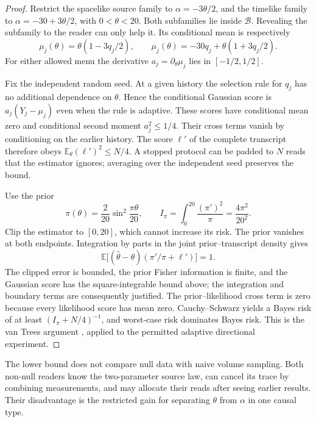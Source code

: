 \documentclass[12pt,a4paper]{article}
\theoremstyle{definition}
\newcommand{\E}{\mathbb E}
\begin{document}
\begin{proof}
Restrict the spacelike source family to $\alpha=-3\theta/2$, and the
timelike family to $\alpha=-30+3\theta/2$, with $0<\theta<20$. Both
subfamilies lie inside $\mathcal B$. Revealing the subfamily to the reader
can only help it. Its conditional mean is respectively
\begin{equation}
 \mu_j(\theta)=\theta(1-3q_j/2),\qquad
 \mu_j(\theta)=-30q_j+\theta(1+3q_j/2).
\end{equation}
For either allowed menu the derivative $a_j=\partial_\theta\mu_j$ lies
in $[-1/2,1/2]$.

Fix the independent random seed. At a given history the selection rule
for $q_j$ has no additional dependence on $\theta$. Hence the conditional
Gaussian score is $a_j(Y_j-\mu_j)$ even when the rule is adaptive. These
scores have conditional mean zero and conditional second moment
$a_j^2\leq1/4$. Their cross terms vanish by conditioning on the earlier
history. The score $\ell'$ of the complete transcript therefore obeys
$\E_\theta(\ell')^2\leq N/4$. A stopped protocol can be padded to $N$
reads that the estimator ignores; averaging over the independent seed
preserves the bound.

Use the prior
\begin{equation}
 \pi(\theta)=\frac2{20}\sin^2\frac{\pi\theta}{20},
 \qquad I_\pi=\int_0^{20}\frac{(\pi')^2}{\pi}
              =\frac{4\pi^2}{20^2}.
 \label{eq:prior}
\end{equation}
Clip the estimator to $[0,20]$, which cannot increase its risk. The prior
vanishes at both endpoints. Integration by parts in the joint
prior--transcript density gives
\begin{equation}
 \E\bigl[(\widehat\theta-\theta)(\pi'/\pi+\ell')\bigr]=1.
\end{equation}
The clipped error is bounded, the prior Fisher information is finite,
and the Gaussian score has the square-integrable bound above; the
integration and boundary terms are consequently justified. The
prior--likelihood cross term is zero because every likelihood score has
mean zero. Cauchy--Schwarz yields a Bayes risk of at least
$(I_\pi+N/4)^{-1}$, and worst-case risk dominates Bayes risk.
This is the van Trees argument \cite{GillLevit1995,GassiatPollardStoltz},
applied to the permitted adaptive directional experiment.
\end{proof}

The lower bound does not compare null data with naive volume sampling.
Both non-null readers know the two-parameter source law, can cancel its
trace by combining measurements, and may allocate their reads after
seeing earlier results. Their disadvantage is the restricted gain for
separating $\theta$ from $\alpha$ in one causal type.
\end{document}
